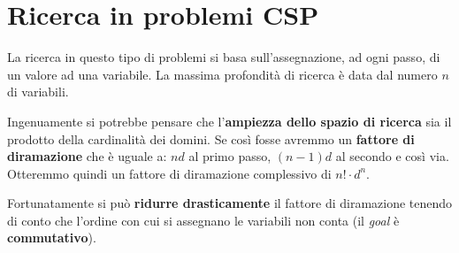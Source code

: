 \section{Ricerca in problemi CSP}
La ricerca in questo tipo di problemi si basa sull'assegnazione, ad ogni passo, di un valore ad una variabile.
La massima profondit\`a di ricerca \`e data dal numero $n$ di variabili.

Ingenuamente si potrebbe pensare che l'\textbf{ampiezza dello spazio di ricerca} sia il prodotto della cardinalit\`a
dei domini. Se cos\`i fosse avremmo un \textbf{fattore di diramazione} che \`e uguale a: $nd$ al primo passo,
$(n-1)d$ al secondo e cos\`i via. Otteremmo quindi un fattore di diramazione complessivo di $n! \cdot d^n$.

Fortunatamente si pu\`o \textbf{ridurre drasticamente} il fattore di diramazione tenendo di conto che l'ordine con
cui si assegnano le variabili non conta (il \emph{goal} \`e \textbf{commutativo}).

